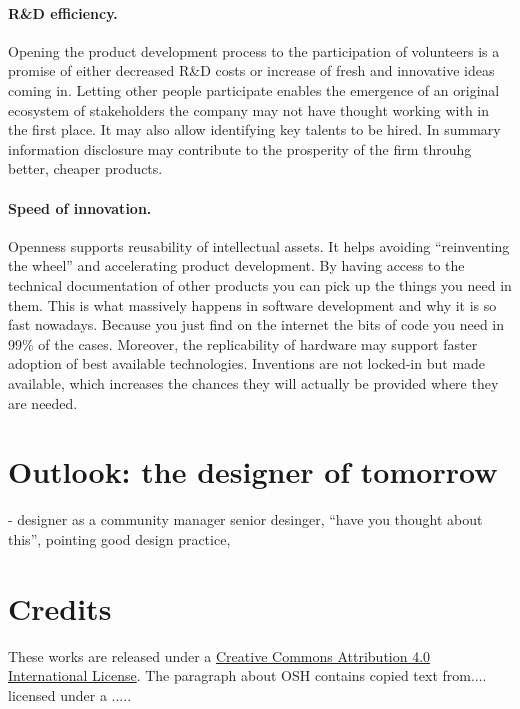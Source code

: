 \documentclass{article}
\begin{document}
\paragraph{R\&D efficiency.} Opening the product development process to the participation of volunteers is a promise of either decreased R\&D costs or increase of fresh and innovative ideas coming in. Letting other people participate enables the emergence of an original ecosystem of stakeholders the company may not have thought working with in the first place. It may also allow identifying key talents to be hired. In summary information disclosure may contribute to the prosperity of the firm throuhg better, cheaper products. 

\paragraph{Speed of innovation.} Openness supports reusability of intellectual assets. It helps avoiding ``reinventing the wheel'' and accelerating product development. By having access to the technical documentation of other products you can pick up the things you need in them. This is what massively happens in software development and why it is so fast nowadays. Because you just find on the internet the bits of code you need in 99\% of the cases. Moreover, the replicability of hardware may support faster adoption of best available technologies. Inventions are not locked-in but made available, which increases the chances they will actually be provided where they are needed.

\section{Outlook: the designer of tomorrow}
\label{sec:designerofthefuture}
- designer as a community manager
senior desinger, "`have you thought about this"', pointing good design practice,

\section*{Credits}
\label{sec:credits}
These works are released under a \href{https://creativecommons.org/licenses/by/4.0/}{Creative Commons Attribution 4.0 International License}. {\color{red}The paragraph about OSH contains copied text from.... licensed under a .....}

\begin{comment}
https://www.researchgate.net/publication/320601945_Distributed_economies_through_open_design_and_digital_manufacturing

\end{comment}



\end{document}
